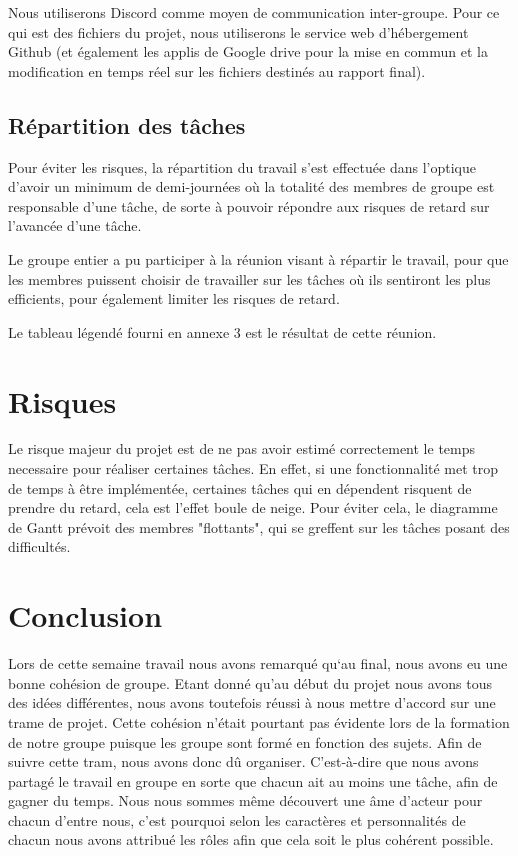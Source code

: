 \documentclass[a4paper,12pt]{article} %
\begin{document}
Nous utiliserons Discord comme moyen de communication inter-groupe. Pour ce qui est des fichiers du projet, nous utiliserons le service web d’hébergement Github (et également les applis de Google drive pour la mise en commun  et la modification en temps réel sur les fichiers destinés au rapport final).


\newpage
  \subsection{Répartition des tâches}

Pour éviter les risques, la répartition du travail s’est effectuée dans l’optique d’avoir un minimum de demi-journées où la totalité des membres de groupe est responsable d’une tâche, de sorte à pouvoir répondre aux risques de retard sur l’avancée d’une tâche.

Le groupe entier a pu participer à la réunion visant à répartir le travail, pour que les membres puissent choisir de travailler sur les tâches où ils sentiront les plus efficients, pour également limiter les risques de retard.

Le tableau légendé fourni en annexe 3 est le résultat de cette réunion.


\section{Risques}

Le risque majeur du projet est de ne pas avoir estimé correctement le temps necessaire pour réaliser certaines tâches. En effet, si une fonctionnalité met trop de temps à être implémentée, certaines tâches qui en dépendent risquent de prendre du retard, cela est l'effet boule de neige. Pour éviter cela, le diagramme de Gantt prévoit des membres "flottants", qui se greffent sur les tâches posant des difficultés.

\section*{Conclusion}

Lors de cette semaine travail nous avons remarqué qu‘au final, nous avons eu une bonne cohésion de groupe. Etant donné qu’au début du projet nous avons tous des idées différentes, nous avons toutefois réussi à nous mettre d’accord sur une trame de projet. Cette cohésion n’était pourtant pas évidente lors de la formation de notre groupe puisque les groupe sont formé en fonction des sujets. Afin de suivre cette tram, nous avons donc dû organiser. C’est-à-dire que nous avons partagé le travail en groupe en sorte que chacun ait au moins une tâche, afin de gagner du temps. Nous nous sommes même découvert une âme d’acteur pour chacun d’entre nous, c’est pourquoi selon les caractères et personnalités de chacun nous avons attribué les rôles afin que cela soit le plus cohérent possible.
\end{document}
